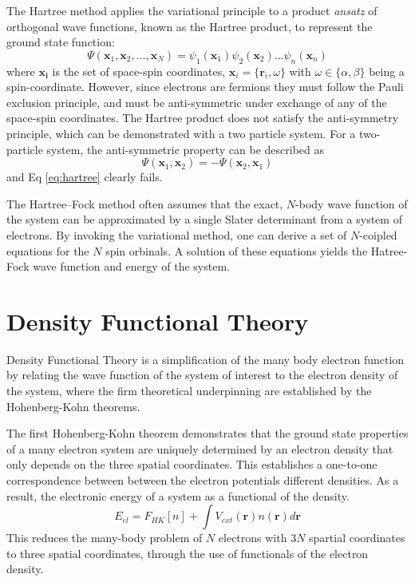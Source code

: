 The Hartree method\cite{hartree1928_hartree,slater1928_hartree,gaunt1928_hartree} applies the variational principle to a product \emph{ansatz} of orthogonal wave functions, known as the Hartree product, to represent the ground state function:
\begin{equation}
\label{eq:hartree}
	\Psi(\bm{x}_1,\bm{x}_2,...,\bm{x}_N)=\psi_1(\bm{x}_1)\psi_2(\bm{x}_2)...\psi_n(\bm{x}_n)
\end{equation}
where $\bm{x_i}$ is the set of space-spin coordinates, $\bm{x}_i=\{\bm{r}_i,\omega\}$ with $\omega \in \{\alpha,\beta\}$ being a spin-coordinate.
However, since electrons are fermions they must follow the Pauli exclusion principle, and must be anti-symmetric under exchange of any of the space-spin coordinates.  The Hartree product does not satisfy the anti-symmetry principle\cite{slater1930_antisymmetry,fock1930_antisymmetry}, which can be demonstrated with a two particle system.  For a two-particle system, the anti-symmetric property can be described as 
\begin{equation}
\label{eq:antisymmetry}
	\Psi(\bm{x}_1,\bm{x}_2) = -\Psi(\bm{x}_2,\bm{x}_1)
\end{equation}
and Eq \ref{eq:hartree} clearly fails.

The Hartree–Fock method often assumes that the exact, $N$-body wave function of the system can be approximated by a single Slater determinant from a system of electrons.  By invoking the variational method, one can derive a set of $N$-coipled equations for the $N$ spin orbinals.  A solution of these equations yields the Hatree-Fock wave function and energy of the system.

\section{Density Functional Theory}

Density Functional Theory is a simplification of the many body electron function by relating the wave function of the system of interest to the electron density of the system, where the firm theoretical underpinning are established by the Hohenberg-Kohn theorems\cite{hohenberg1964_dft}.

The first Hohenberg-Kohn theorem demonstrates that the ground state properties of a many electron system are uniquely determined by an electron density that only depends on the three spatial coordinates.  This establishes a one-to-one correspondence between between the electron potentials different densities.  As a result, the electronic energy of a system as a functional of the density.
\begin{equation}
	E_{el}=F_{HK}[n]+\int V_{ext}(\bm{r})n(\bm{r})d\bm{r}
\end{equation}
This reduces the many-body problem of $N$ electrons with $3N$ spartial coordinates to three spatial coordinates, through the use of functionals of the electron density.

